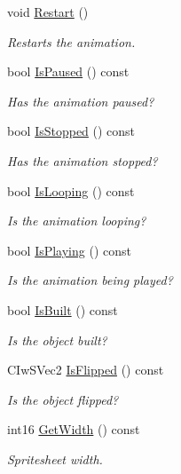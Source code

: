 \begin{DoxyCompactItemize}
void \hyperlink{class_iw2_d_sprite_a5f2f27a5c85257223c772d212f8c46b3}{Restart} ()
\begin{DoxyCompactList}\small\item\em Restarts the animation. \end{DoxyCompactList}\item 
bool \hyperlink{class_iw2_d_sprite_aba66c9e6013a775a064d3f4a7eccb904}{IsPaused} () const 
\begin{DoxyCompactList}\small\item\em Has the animation paused? \end{DoxyCompactList}\item 
bool \hyperlink{class_iw2_d_sprite_ab02cd446c020e9a96a62e5a0e9969e01}{IsStopped} () const 
\begin{DoxyCompactList}\small\item\em Has the animation stopped? \end{DoxyCompactList}\item 
bool \hyperlink{class_iw2_d_sprite_afb7a12d58e635bad98dfa2d17acc7d57}{IsLooping} () const 
\begin{DoxyCompactList}\small\item\em Is the animation looping? \end{DoxyCompactList}\item 
bool \hyperlink{class_iw2_d_sprite_ae2ef1f10822494b46681f1d2c7860164}{IsPlaying} () const 
\begin{DoxyCompactList}\small\item\em Is the animation being played? \end{DoxyCompactList}\item 
bool \hyperlink{class_iw2_d_sprite_af500464015fc62c1ed15f0006b7cb9b0}{IsBuilt} () const 
\begin{DoxyCompactList}\small\item\em Is the object built? \end{DoxyCompactList}\item 
CIwSVec2 \hyperlink{class_iw2_d_sprite_a3c892d5ea06d33d5ee567e289f222702}{IsFlipped} () const 
\begin{DoxyCompactList}\small\item\em Is the object flipped? \end{DoxyCompactList}\item 
int16 \hyperlink{class_iw2_d_sprite_a4aa6d6c50e7785128082ada62e51f3f8}{GetWidth} () const 
\begin{DoxyCompactList}\small\item\em Spritesheet width. \end{DoxyCompactList}\item 

\end{DoxyCompactItemize}
